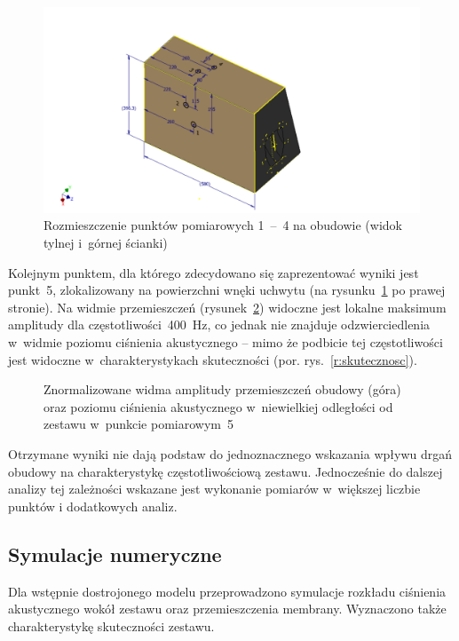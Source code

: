 \documentclass[12pt]{oska}
\newcommand{\range}[2]{\num{#1}~--~\num{#2}}
\begin{document}
	\begin{figure}[!ht]
		\centering
		\includegraphics[width=.8\textwidth,trim={5cm .3cm 5cm 2.7cm},clip]{wibrometr.pdf}
		\caption{Rozmieszczenie punktów pomiarowych \range{1}{4} na obudowie (widok tylnej i~górnej ścianki)}
		\label{r:wibro_pkt}
	\end{figure}
	
	Kolejnym punktem, dla którego zdecydowano się zaprezentować wyniki jest punkt~\num{5}, zlokalizowany na powierzchni wnęki uchwytu (na rysunku~\ref{r:wibro_pkt} po prawej stronie). Na widmie przemieszczeń (rysunek~\ref{r:wibrometr_5}) widoczne jest lokalne maksimum amplitudy dla częstotliwości~\SI{400}{\hertz}, co jednak nie znajduje odzwierciedlenia w~widmie poziomu ciśnienia akustycznego -- mimo że podbicie tej częstotliwości jest widoczne w~charakterystykach skuteczności (por. rys.~\ref{r:skutecznosc}).%
	
	\begin{figure}[!ht]
		\centering
		\caption{Znormalizowane widma amplitudy przemieszczeń obudowy (góra) oraz poziomu ciśnienia akustycznego w~niewielkiej odległości od zestawu w~punkcie pomiarowym~\num{5}}
		\label{r:wibrometr_5}
	\end{figure}
	
	Otrzymane wyniki nie dają podstaw do jednoznacznego wskazania wpływu drgań obudowy na charakterystykę częstotliwościową zestawu. Jednocześnie do dalszej analizy tej zależności wskazane jest wykonanie pomiarów w~większej liczbie punktów i dodatkowych analiz.
	
	\subsection{Symulacje numeryczne}
	
	Dla wstępnie dostrojonego modelu przeprowadzono symulacje rozkładu ciśnienia akustycznego wokół zestawu oraz przemieszczenia membrany. Wyznaczono także charakterystykę skuteczności zestawu. 
	
\end{document}
